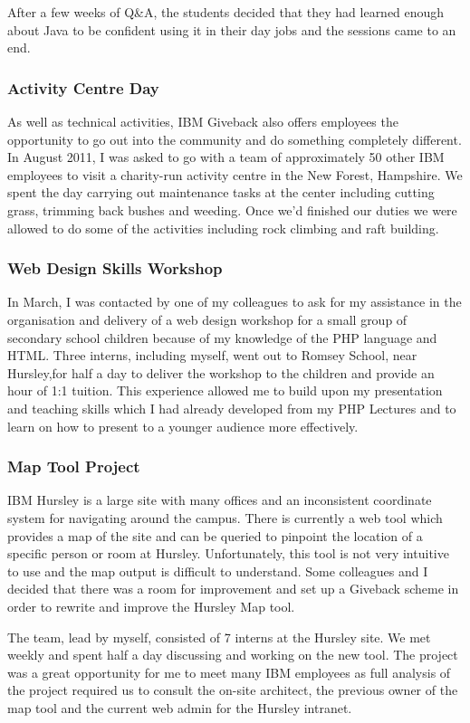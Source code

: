 \documentclass[12pt,a4paper]{article}
\begin{document}
After a few weeks of Q\&A, the students decided that they had learned enough 
about Java to be confident using it in their day jobs and the sessions came 
to an end.

\subsubsection{Activity Centre Day}
As well as technical activities, IBM Giveback also offers employees the 
opportunity to go out into the community and do something completely different.
In August 2011, I was asked to go with a team of approximately 50 other IBM
employees to visit a charity-run activity centre in the New Forest, Hampshire.
We spent the day carrying out maintenance tasks at the center including 
cutting grass, trimming back bushes and weeding. Once we'd finished our duties
we were allowed to do some of the activities including rock climbing and raft
building.

\subsubsection{Web Design Skills Workshop}
In March, I was contacted by one of my colleagues to ask for my assistance in
the organisation and delivery of a web design workshop for a small group of
secondary school children because of my knowledge of the PHP language and HTML. 
Three interns, including myself, went out to Romsey School, near Hursley,for 
half a day to deliver the workshop to the children and provide an hour of 1:1
tuition. This experience allowed me to build upon my presentation and teaching
skills which I had already developed from my PHP Lectures and to learn on how
to present to a younger audience more effectively.

\subsubsection{Map Tool Project}
IBM Hursley is a large site with many offices and an inconsistent coordinate
system for navigating around the campus. There is currently a web tool which
provides a map of the site and can be queried to pinpoint the location of a
specific person or room at Hursley. Unfortunately, this tool is not very 
intuitive to use and the map output is difficult to understand. Some colleagues
and I decided that there was a room for improvement and set up a Giveback 
scheme in order to rewrite and improve the Hursley Map tool.

The team, lead by myself, consisted of 7 interns at the Hursley site. We met
weekly and spent half a day discussing and working on the new tool. The 
project was a great opportunity for me to meet many IBM employees as full 
analysis of the project required us to consult the on-site architect, the
previous owner of the map tool and the current web admin for the Hursley 
intranet. 
\end{document}
